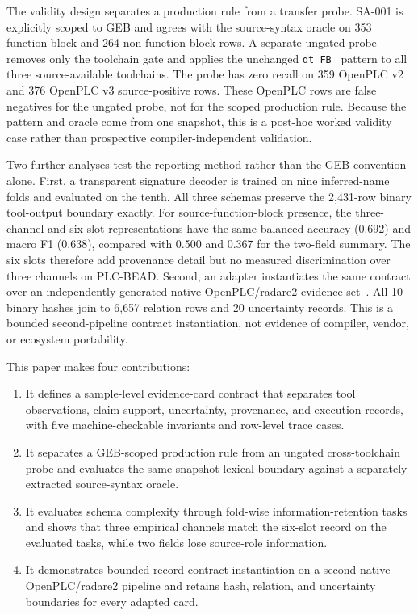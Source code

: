 \documentclass[manuscript,screen,review]{acmart}
\begin{document}
The validity design separates a production rule from a transfer probe. SA-001 is explicitly scoped to GEB and agrees with the source-syntax oracle on 353 function-block and 264 non-function-block rows. A separate ungated probe removes only the toolchain gate and applies the unchanged \texttt{dt\_FB\_} pattern to all three source-available toolchains. The probe has zero recall on 359 OpenPLC v2 and 376 OpenPLC v3 source-positive rows. These OpenPLC rows are false negatives for the ungated probe, not for the scoped production rule. Because the pattern and oracle come from one snapshot, this is a post-hoc worked validity case rather than prospective compiler-independent validation.

Two further analyses test the reporting method rather than the GEB convention alone. First, a transparent signature decoder is trained on nine inferred-name folds and evaluated on the tenth. All three schemas preserve the 2{,}431-row binary tool-output boundary exactly. For source-function-block presence, the three-channel and six-slot representations have the same balanced accuracy (0.692) and macro F1 (0.638), compared with 0.500 and 0.367 for the two-field summary. The six slots therefore add provenance detail but no measured discrimination over three channels on PLC-BEAD. Second, an adapter instantiates the same contract over an independently generated native OpenPLC/radare2 evidence set~\cite{radare2}. All 10 binary hashes join to 6{,}657 relation rows and 20 uncertainty records. This is a bounded second-pipeline contract instantiation, not evidence of compiler, vendor, or ecosystem portability.

This paper makes four contributions:

\begin{enumerate}
\item It defines a sample-level evidence-card contract that separates tool observations, claim support, uncertainty, provenance, and execution records, with five machine-checkable invariants and row-level trace cases.
\item It separates a GEB-scoped production rule from an ungated cross-toolchain probe and evaluates the same-snapshot lexical boundary against a separately extracted source-syntax oracle.
\item It evaluates schema complexity through fold-wise information-retention tasks and shows that three empirical channels match the six-slot record on the evaluated tasks, while two fields lose source-role information.
\item It demonstrates bounded record-contract instantiation on a second native OpenPLC/radare2 pipeline and retains hash, relation, and uncertainty boundaries for every adapted card.
\end{enumerate}
\end{document}
